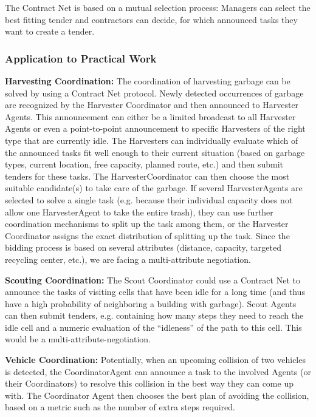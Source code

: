 The Contract Net is based on a mutual selection process: Managers can select the best fitting tender and contractors can decide, for which announced tasks they want to create a tender.  

\subsubsection{Application to Practical Work}

\textbf{Harvesting Coordination:} The coordination of harvesting garbage can be solved by using a Contract Net protocol. Newly detected occurrences of garbage are recognized by the Harvester Coordinator and then announced to Harvester Agents. This announcement can either be a limited broadcast to all Harvester Agents or even a point-to-point announcement to specific Harvesters of the right type that are currently idle. The Harvesters can individually evaluate which of the announced tasks fit well enough to their current situation (based on garbage types, current location, free capacity, planned route, etc.) and then submit tenders for these tasks. The HarvesterCoordinator can then choose the most suitable candidate(s) to take care of the garbage. If several HarvesterAgents are selected to solve a single task (e.g. because their individual capacity does not allow one HarvesterAgent to take the entire trash), they can use further coordination mechanisms to split up the task among them, or the Harvester Coordinator assigns the exact distribution of splitting up the task. Since the bidding process is based on several attributes (distance, capacity, targeted recycling center, etc.), we are facing a multi-attribute negotiation.

\textbf{Scouting Coordination:} The Scout Coordinator could use a Contract Net to announce the tasks of visiting cells that have been idle for a long time (and thus have a high probability of neighboring a building with garbage). Scout Agents can then submit tenders, e.g. containing how many steps they need to reach the idle cell and a numeric evaluation of the “idleness” of the path to this cell. This would be a multi-attribute-negotiation.

\textbf{Vehicle Coordination:} Potentially, when an upcoming collision of two vehicles is detected, the CoordinatorAgent can announce a task to the involved Agents (or their Coordinators) to resolve this collision in the best way they can come up with. The Coordinator Agent then chooses the best plan of avoiding the collision, based on a metric such as the number of extra steps required.


